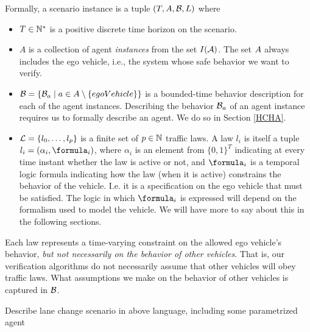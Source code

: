 Formally, a scenario instance is a tuple $(T, A,\mathcal{B}, L)$ where
\begin{itemize}
\item $T \in \mathbb{N}^*$ is a positive discrete time horizon on the scenario.
%
\item $A$ is a collection of agent \emph{instances} from the set $I(\mathcal{A})$.
The set $A$ always includes the ego vehicle, i.e., the system whose safe behavior we want to verify.
%
\item $\mathcal{B} = \{\mathcal{B}_a \;|\; a \in A \setminus \{egoVehicle\}\}$ is a bounded-time behavior description for each of the agent instances.
Describing the behavior $\mathcal{B}_a$ of an agent instance requires us to formally describe an agent. 
We do so in Section \ref{HCHA}.
%
\item $\mathcal{L} = \{l_0,\ldots,l_p\}$ is a finite set of $p \in \mathbb{N}$ traffic laws. 
A law $l_i$ is itself a tuple $l_i = (\alpha_i,\formula_i)$, 
where $\alpha_i$ is an element from $\{0,1\}^T$ indicating at every time instant whether the law is active or not, 
and $\formula_i$ is a temporal logic formula indicating how the law (when it is active) constrains the behavior of the vehicle. 
I.e. it is a specification on the ego vehicle that must be satisfied. 
The logic in which $\formula_i$ is expressed will depend on the formalism used to model the vehicle. 
We will have more to say about this in the following sections.
\end{itemize}

Each law represents a time-varying constraint on the allowed ego vehicle's behavior, \emph{but not necessarily on the behavior of other vehicles}.
That is, our verification algorithms do not necessarily assume that other vehicles will obey traffic laws. 
What assumptions we make on the behavior of other vehicles is captured in $\mathcal{B}$.

\begin{exmp}
	Describe lane change scenario in above language, including some parametrized agent
\end{exmp}
	
%	